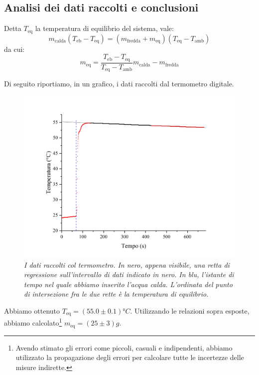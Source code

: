 \documentclass{article}
\begin{document}
\subsection{Analisi dei dati raccolti e conclusioni}
Detta $T_\text{eq}$ la temperatura di equilibrio del sistema, vale:
\[
m_\text{calda} (T_\text{eb} - T_\text{eq}) =
(m_\text{fredda} + m_\text{eq})(T_\text{eq} - T_\text{amb})
\]
da cui:
\[
m_\text{eq} = \frac{T_\text{eb}-T_\text{eq}}{T_\text{eq}-T_\text{amb}} m_\text{calda} - m_\text{fredda}
\]

Di seguito riportiamo, in un grafico, i dati raccolti dal termometro digitale.

\begin{center}
    \begin{figure}[H]
        \includegraphics[trim={2cm 1cm 2cm 2.1cm},clip,width=\textwidth]{img/RegH2O.jpg}
        \caption{\emph{I dati raccolti col termometro.
        In nero, appena visibile, una retta di regressione sull'intervallo di dati indicato in nero.
        In blu, l'istante di tempo nel quale abbiamo inserito l'acqua calda.
        L'ordinata del punto di intersezione fra le due rette è la temperatura di equilibrio.
        }}
    \end{figure}
\end{center}

Abbiamo ottenuto $T_\text{eq} = \left(55.0\pm0.1\right)\unit{\degree C}$.
Utilizzando le relazioni sopra esposte, abbiamo calcolato\footnote{
    Avendo stimato gli errori come piccoli, casuali e indipendenti,
    abbiamo utilizzato la propagazione degli errori per calcolare tutte le
    incertezze delle misure indirette.
} $m_\text{eq} = \left(25\pm3\right)\unit{g}$.
\end{document}
